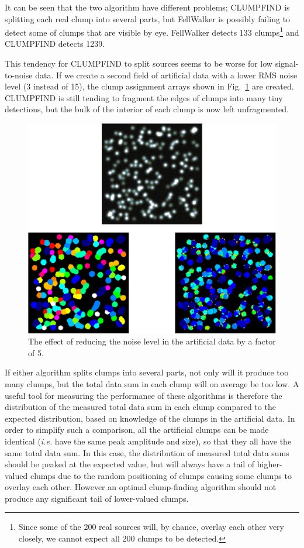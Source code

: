 \documentclass[final,authoryear,5p,times,twocolumn]{elsarticle}
\begin{document}
It can be seen that the two algorithm have different problems; CLUMPFIND
is splitting each real clump into several parts, but FellWalker is
possibly failing to detect some of clumps that are visible by eye. FellWalker
detects 133 clumps\footnote{Since some of the 200 real sources will, by
chance, overlay each other very closely, we cannot expect all 200 clumps
to be detected.} and CLUMPFIND detects 1239.

This tendency for CLUMPFIND to split sources seems to be worse for low
signal-to-noise data. If we create a second field of artificial data with
a lower RMS noise level (3 instead of 15), the clump assignment arrays
shown in Fig.~\ref{fig:comp2} are created. CLUMPFIND is still tending to
fragment the edges of clumps into many tiny detections, but the bulk of
the interior of each clump is now left unfragmented.

\begin{figure}
\includegraphics[width=\columnwidth]{comp2}
\caption{The effect of reducing the noise level in the artificial data
by a factor of 5.}
\label{fig:comp2}
\end{figure}

If either algorithm splits clumps into several parts, not only will it
produce too many clumps, but the total data sum in each clump will on
average be too low. A useful tool for measuring the performance of these
algorithms is therefore the distribution of the measured total data sum
in each clump compared to the expected distribution, based on knowledge
of the clumps in the artificial data. In order to simplify such a
comparison, all the artificial clumps can be made identical (\emph{i.e.}
have the same peak amplitude and size), so that they all have the same
total data sum. In this case, the distribution of measured total data
sums should be peaked at the expected value, but will always have a tail
of higher-valued clumps due to the random positioning of clumps causing
some clumps to overlay each other. However an optimal clump-finding
algorithm should not produce any significant tail of lower-valued clumps.
\end{document}
